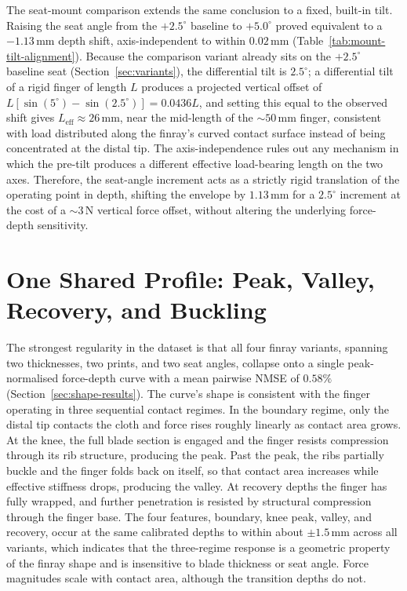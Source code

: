 The seat-mount comparison extends the same conclusion to a fixed,
built-in tilt. Raising the seat angle from the $+2.5^{\circ}$ baseline
to $+5.0^{\circ}$ proved equivalent to a $-1.13$\,mm depth shift,
axis-independent to within $0.02$\,mm
(Table~\ref{tab:mount-tilt-alignment}). Because the comparison variant
already sits on the $+2.5^{\circ}$ baseline seat
(Section~\ref{sec:variants}), the differential tilt is $2.5^{\circ}$;
a differential tilt of a rigid finger of length $L$ produces a
projected vertical offset of
$L\left[\sin(5^{\circ}) - \sin(2.5^{\circ})\right] = 0.0436 L$, and
setting this equal to the observed shift gives
$L_{\mathrm{eff}} \approx 26$\,mm, near the mid-length of the
$\sim 50$\,mm finger, consistent with load distributed along the
finray's curved contact surface instead of being concentrated at the
distal tip. The axis-independence rules out any mechanism in which the
pre-tilt produces a different effective load-bearing length on the two
axes. Therefore, the seat-angle increment acts as a strictly rigid
translation of the operating point in depth, shifting the envelope by
$1.13$\,mm for a $2.5^{\circ}$ increment at the cost of a $\sim 3$\,N
vertical force offset, without altering the underlying force-depth
sensitivity.

\section{One Shared Profile: Peak, Valley, Recovery, and Buckling}
\label{sec:shape-discussion}
\label{sec:bell-plus-valley}

The strongest regularity in the dataset is that all four finray
variants, spanning two thicknesses, two prints, and two seat angles,
collapse onto a single peak-normalised force-depth curve with a mean
pairwise NMSE of $0.58\%$ (Section~\ref{sec:shape-results}). The curve's shape is
consistent with the finger operating in three sequential contact
regimes. In the boundary regime, only the distal tip contacts the
cloth and force rises roughly linearly as contact area grows. At the
knee, the full blade section is engaged and the finger resists
compression through its rib structure, producing the peak. Past the
peak, the ribs partially buckle and the finger folds back on itself,
so that contact area increases while effective stiffness drops,
producing the valley. At recovery depths the finger has fully wrapped,
and further penetration is resisted by structural compression through
the finger base. The four features, boundary, knee peak, valley, and
recovery, occur at the same calibrated depths to within about
$\pm 1.5$\,mm across all variants, which indicates that the
three-regime response is a geometric property of the finray shape and
is insensitive to blade thickness or seat angle. Force magnitudes scale
with contact area, although the transition depths do not.

